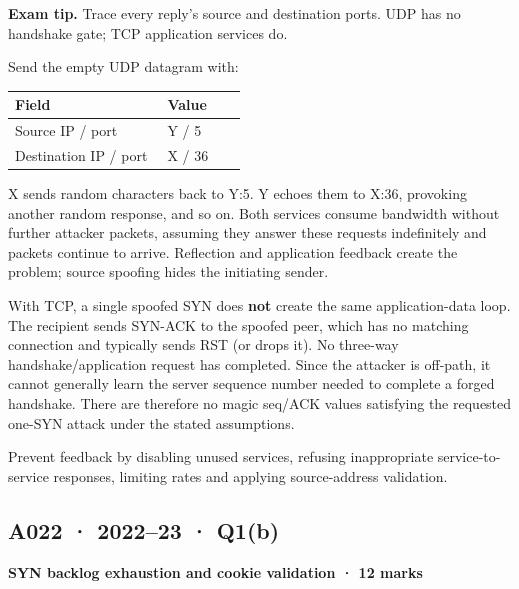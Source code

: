\documentclass[11pt,a4paper]{article}
\begin{document}
{\color{ForestGreen}\textbf{Exam tip.} Trace every reply's source and destination ports. UDP has no handshake gate; TCP application services do.}


Send the empty UDP datagram with:



{\small\setlength{\tabcolsep}{3pt}
\begin{longtable}{>{\raggedright\arraybackslash}p{0.63270\linewidth}>{\raggedright\arraybackslash}p{0.33819\linewidth}}
\toprule
\textbf{Field} & \textbf{Value} \\
\midrule
\endhead
Source IP /\allowbreak{} port & Y /\allowbreak{} 5 \\
Destination IP /\allowbreak{} port & X /\allowbreak{} 36 \\
\bottomrule
\end{longtable}
}

X sends random characters back to Y:5. Y echoes them to X:36,\allowbreak{} provoking another random response,\allowbreak{} and so on. Both services consume bandwidth without further attacker packets,\allowbreak{} assuming they answer these requests indefinitely and packets continue to arrive. Reflection and application feedback create the problem; source spoofing hides the initiating sender.


With TCP,\allowbreak{} a single spoofed SYN does \textbf{not} create the same application-data loop. The recipient sends SYN-ACK to the spoofed peer,\allowbreak{} which has no matching connection and typically sends RST (or drops it). No three-way handshake/\allowbreak{}application request has completed. Since the attacker is off-path,\allowbreak{} it cannot generally learn the server sequence number needed to complete a forged handshake. There are therefore no magic seq/\allowbreak{}ACK values satisfying the requested one-SYN attack under the stated assumptions.


Prevent feedback by disabling unused services,\allowbreak{} refusing inappropriate service-to-service responses,\allowbreak{} limiting rates and applying source-address validation.




\clearpage
\subsection{A022 · 2022–23 · Q1(b)}\label{a022}

\textbf{SYN backlog exhaustion and cookie validation · 12 marks}
\end{document}
